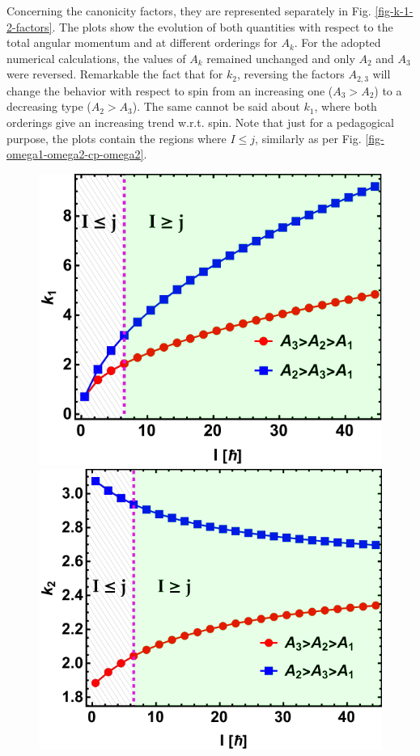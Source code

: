 Concerning the canonicity factors, they are represented separately in Fig. \ref{fig-k-1-2-factors}. The plots show the evolution of both quantities with respect to the total angular momentum and at different orderings for $A_k$. For the adopted numerical calculations, the values of $A_k$ remained unchanged and only $A_2$ and $A_3$ were reversed. Remarkable the fact that for $k_2$, reversing the factors $A_{2,3}$ will change the behavior with respect to spin from an increasing one ($A_3>A_2$) to a decreasing type ($A_2>A_3$). The same cannot be said about $k_1$, where both orderings give an increasing trend w.r.t. spin. Note that just for a pedagogical purpose, the plots contain the regions where $I\leq j$, similarly as per Fig. \ref{fig-omega1-omega2-cp-omega2}.
\begin{figure}
    \centering
    \includegraphics[scale=0.7]{Chapters/Figures/k1_factor.pdf}
    \includegraphics[scale=0.7]{Chapters/Figures/k2_factor.pdf}

\end{figure}
